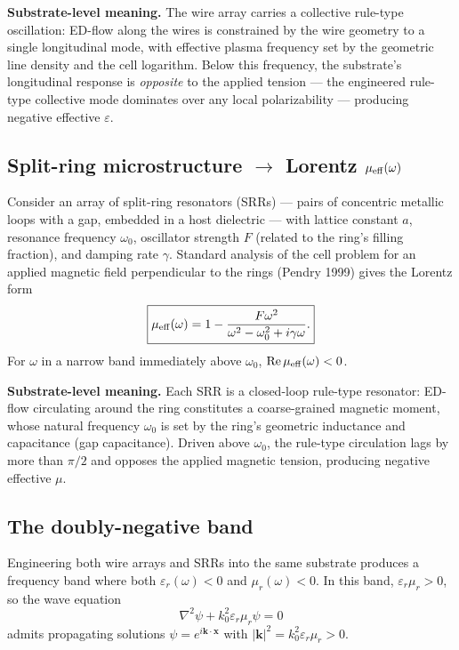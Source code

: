 \documentclass[11pt,a4paper]{article}
\begin{document}
\textbf{Substrate-level meaning.} The wire array carries a collective rule-type oscillation: ED-flow along the wires is constrained by the wire geometry to a single longitudinal mode, with effective plasma frequency set by the geometric line density and the cell logarithm. Below this frequency, the substrate's longitudinal response is \emph{opposite} to the applied tension --- the engineered rule-type collective mode dominates over any local polarizability --- producing negative effective $\varepsilon$.

\subsection{Split-ring microstructure $\to$ Lorentz $\mu_{\rm eff}(\omega)$}

Consider an array of split-ring resonators (SRRs) --- pairs of concentric metallic loops with a gap, embedded in a host dielectric --- with lattice constant $a$, resonance frequency $\omega_0$, oscillator strength $F$ (related to the ring's filling fraction), and damping rate $\gamma$. Standard analysis of the cell problem for an applied magnetic field perpendicular to the rings (Pendry 1999) gives the Lorentz form
\[
\boxed{\mu_{\rm eff}(\omega) = 1 - \frac{F\omega^2}{\omega^2 - \omega_0^2 + i\gamma\omega}.}
\]
For $\omega$ in a narrow band immediately above $\omega_0$, $\mathrm{Re}\,\mu_{\rm eff}(\omega) < 0$.

\textbf{Substrate-level meaning.} Each SRR is a closed-loop rule-type resonator: ED-flow circulating around the ring constitutes a coarse-grained magnetic moment, whose natural frequency $\omega_0$ is set by the ring's geometric inductance and capacitance (gap capacitance). Driven above $\omega_0$, the rule-type circulation lags by more than $\pi/2$ and opposes the applied magnetic tension, producing negative effective $\mu$.

\subsection{The doubly-negative band}

Engineering both wire arrays and SRRs into the same substrate produces a frequency band where both $\varepsilon_r(\omega) < 0$ and $\mu_r(\omega) < 0$. In this band, $\varepsilon_r\mu_r > 0$, so the wave equation
\[
\nabla^2\psi + k_0^2\varepsilon_r\mu_r\psi = 0
\]
admits propagating solutions $\psi = e^{i\mathbf{k}\cdot\mathbf{x}}$ with $|\mathbf{k}|^2 = k_0^2\varepsilon_r\mu_r > 0$.
\end{document}
